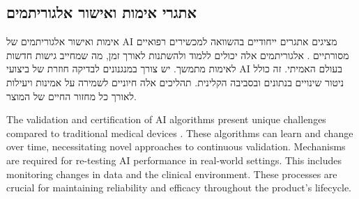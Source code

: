 \documentclass[12pt,a4paper]{article}
\newenvironment{hebrewblock}{%
  \begin{tcolorbox}[enhanced,breakable,title={\hebrewfont עברית},
    colback=blue!3!white,colframe=blue!35!white,fonttitle=\bfseries,
    attach boxed title to top right={yshift=-2.5mm,xshift=-4mm},
    boxed title style={colback=blue!35!white,sharp corners}]
  \begin{hebrew}
}{%
  \end{hebrew}\end{tcolorbox}\medskip
}
\newenvironment{englishblock}{%
  \begin{tcolorbox}[enhanced,breakable,title={English Translation},
    colback=gray!4!white,colframe=gray!40!white,fonttitle=\bfseries]
}{%
  \end{tcolorbox}\medskip
}
\begin{document}
\subsection{\texthebrew{אתגרי אימות ואישור אלגוריתמים}}
\begin{hebrewblock}
אימות ואישור אלגוריתמים של AI מציגים אתגרים ייחודיים בהשוואה למכשירים רפואיים מסורתיים \cite{regdesk_eu_ai_act}. אלגוריתמים אלה יכולים ללמוד ולהשתנות לאורך זמן, מה שמחייב גישות חדשות לאימות מתמשך. יש צורך במנגנונים לבדיקה חוזרת של ביצועי AI בעולם האמיתי. זה כולל ניטור שינויים בנתונים ובסביבה הקלינית. תהליכים אלה חיוניים לשמירה על אמינות ויעילות לאורך כל מחזור החיים של המוצר.
\end{hebrewblock}
\begin{englishblock}
The validation and certification of AI algorithms present unique challenges compared to traditional medical devices \cite{regdesk_eu_ai_act}. These algorithms can learn and change over time, necessitating novel approaches to continuous validation. Mechanisms are required for re-testing AI performance in real-world settings. This includes monitoring changes in data and the clinical environment. These processes are crucial for maintaining reliability and efficacy throughout the product's lifecycle.
\end{englishblock}
\end{document}
